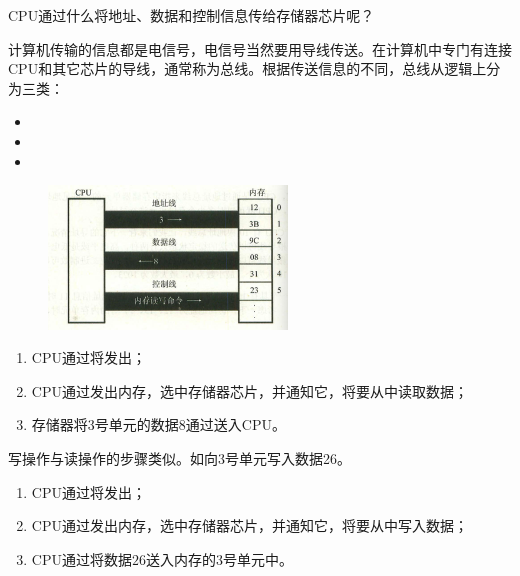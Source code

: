 %
\begin{frame}
\begin{wenti}
CPU通过什么将地址、数据和控制信息传给存储器芯片呢？
\end{wenti} \pause 
 
计算机传输的信息都是电信号，电信号当然要用导线传送。在计算机中专门有连接CPU和其它芯片的导线，通常称为总线。根据传送信息的不同，总线从逻辑上分为三类： 

\begin{itemize}
\item {} 
\item {}
\item {}
\end{itemize}
\end{frame}
%
\begin{frame}
\begin{figure}
\centering
\includegraphics[width=2.5in]{ch01/fig/cpu_read}
\end{figure}
\begin{enumerate}
\item CPU通过将发出；
\item CPU通过发出内存，选中存储器芯片，并通知它，将要从中读取数据；
\item 存储器将$3$号单元的数据$8$通过送入CPU。
\end{enumerate}
\end{frame}
%
\begin{frame}
写操作与读操作的步骤类似。如向$3$号单元写入数据26。\vspace{0.1in}

\begin{enumerate}
\item CPU通过将发出；
\item CPU通过发出内存，选中存储器芯片，并通知它，将要从中写入数据；
\item CPU通过将数据$26$送入内存的$3$号单元中。
\end{enumerate}
\end{frame}
